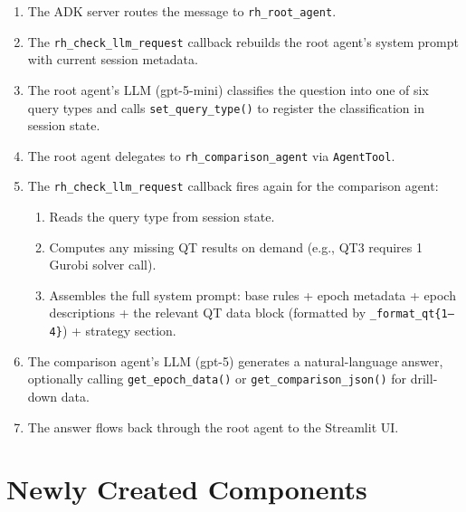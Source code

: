 \documentclass[11pt, a4paper]{article}
\begin{document}
\begin{enumerate}[leftmargin=2em]
    \item The \textcolor{shared}{ADK server} routes the message to
          \textcolor{newcode}{\texttt{rh\_root\_agent}}.
    \item The \textcolor{newcode}{\texttt{rh\_check\_llm\_request}} callback
          rebuilds the root agent's system prompt with current session metadata.
    \item The root agent's LLM (\textcolor{reused}{gpt-5-mini}) classifies
          the question into one of six query types and calls
          \textcolor{newcode}{\texttt{set\_query\_type()}} to register the
          classification in session state.
    \item The root agent delegates to
          \textcolor{newcode}{\texttt{rh\_comparison\_agent}} via
          \texttt{AgentTool}.
    \item The \textcolor{newcode}{\texttt{rh\_check\_llm\_request}} callback
          fires again for the comparison agent:
    \begin{enumerate}
        \item Reads the query type from session state.
        \item Computes any missing QT results on demand (e.g., QT3
              requires 1 Gurobi solver call).
        \item Assembles the full system prompt: base rules + epoch metadata
              + epoch descriptions + the relevant QT data block (formatted
              by \texttt{\_format\_qt\{1--4\}}) + strategy section.
    \end{enumerate}
    \item The comparison agent's LLM (\textcolor{reused}{gpt-5}) generates
          a natural-language answer, optionally calling
          \textcolor{newcode}{\texttt{get\_epoch\_data()}} or
          \textcolor{newcode}{\texttt{get\_comparison\_json()}} for
          drill-down data.
    \item The answer flows back through the root agent to the
          \textcolor{shared}{Streamlit UI}.
\end{enumerate}


\section{Newly Created Components}
\label{sec:new}
\end{document}
